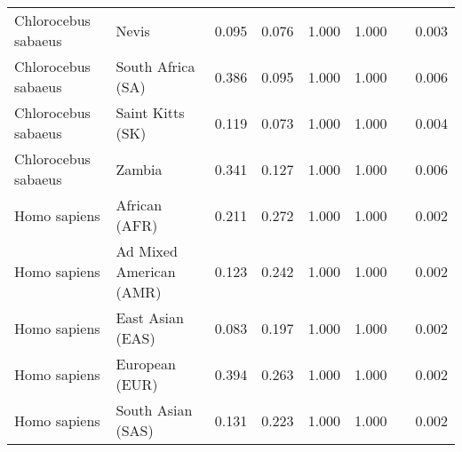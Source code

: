 \begin{center}
\begin{adjustbox}{width = 1\textwidth}
\begin{tabular}{|l|l|r|r|r|r|r|}
 Chlorocebus sabaeus &                           Nevis &                                              0.095 &                                              0.076 &                1.000 &                                  1.000~~ &              0.003 \\
 Chlorocebus sabaeus &               South Africa (SA) &                                              0.386 &                                              0.095 &                1.000 &                                  1.000~~ &              0.006 \\
 Chlorocebus sabaeus &                Saint Kitts (SK) &                                              0.119 &                                              0.073 &                1.000 &                                  1.000~~ &              0.004 \\
 Chlorocebus sabaeus &                          Zambia &                                              0.341 &                                              0.127 &                1.000 &                                  1.000~~ &              0.006 \\
        Homo sapiens &                   African (AFR) &                                              0.211 &                                              0.272 &                1.000 &                                  1.000~~ &              0.002 \\
        Homo sapiens &         Ad Mixed American (AMR) &                                              0.123 &                                              0.242 &                1.000 &                                  1.000~~ &              0.002 \\
        Homo sapiens &                East Asian (EAS) &                                              0.083 &                                              0.197 &                1.000 &                                  1.000~~ &              0.002 \\
        Homo sapiens &                  European (EUR) &                                              0.394 &                                              0.263 &                1.000 &                                  1.000~~ &              0.002 \\
        Homo sapiens &               South Asian (SAS) &                                              0.131 &                                              0.223 &                1.000 &                                  1.000~~ &              0.002 \\
\bottomrule
\end{tabular}
\end{adjustbox}
\newpage
\end{center}
